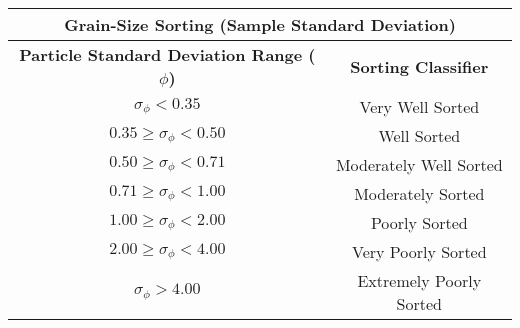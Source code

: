\documentclass[10pt]{article}
\begin{document}
\begin{center}
\begin{tabular}{ c c }
\multicolumn{2}{c}{\textbf{Grain-Size Sorting (Sample Standard Deviation)}} \\
\hline
\textbf{Particle Standard Deviation Range ($\phi$)} &   \textbf{Sorting Classifier} \\
\hline
$\sigma_\phi < 0.35$                      & Very Well Sorted  \\ 
$0.35 \ge \sigma_\phi < 0.50$       & Well Sorted  \\  
$0.50 \ge \sigma_\phi < 0.71$           & Moderately Well Sorted  \\     
$0.71 \ge \sigma_\phi < 1.00$           & Moderately Sorted  \\   
$1.00 \ge \sigma_\phi < 2.00$           & Poorly Sorted  \\
$2.00 \ge \sigma_\phi < 4.00$           &  Very Poorly Sorted \\
$\sigma_\phi > 4.00$           &  Extremely Poorly Sorted  \\
\end{tabular}
\end{center}
\end{document}
